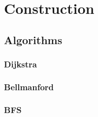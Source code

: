 \section{Construction}









\subsection{Algorithms}
\subsubsection{Dijkstra}
\subsubsection{Bellmanford}
\subsubsection{BFS}





